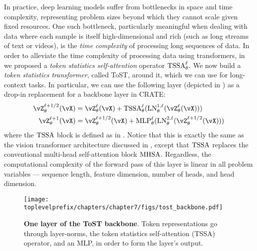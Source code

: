 \documentclass[../../book-main.tex]{subfiles}
\begin{document}
In practice, deep learning models suffer from bottlenecks in space and time complexity, representing problem sizes beyond which they cannot scale given fixed resources. One such bottleneck, particularly meaningful when dealing with data where each sample is itself high-dimensional and rich (such as long streams of text or videos), is the \textit{time complexity} of processing long sequences of data. In order to alleviate the time complexity of processing data using transformers, in  we proposed a \textit{token statistics self-attention} operator \(\operatorname{TSSA}_{\theta}^{\ell}\). We now build a \textit{token statistics transformer}, called ToST, around it, which we can use for long-context tasks. In particular, we can use the following layer (depicted in ) as a drop-in replacement for a backbone layer in CRATE:
\begin{align}
    \vZ_{\theta}^{\ell + 1/2}(\vX)
    &= \vZ_{\theta}^{\ell}(\vX) + \TSSA_{\theta}^{\ell}(\LN_{\theta}^{1, \ell}(\vZ_{\theta}^{\ell}(\vX))) \\ 
    \vZ_{\theta}^{\ell + 1}(\vX)
    &= \vZ_{\theta}^{\ell + 1/2}(\vX) + \MLP_{\theta}^{\ell}(\LN_{\theta}^{2, \ell}(\vZ_{\theta}^{\ell + 1/2}(\vX)))
\end{align}
where the \(\operatorname{TSSA}\) block is defined as in . Notice that this is exactly the same as the vision transformer architecture discussed in , except that \(\operatorname{TSSA}\) replaces the conventional multi-head self-attention block \(\operatorname{MHSA}\). Regardless, the computational complexity of the forward pass of this layer is linear in all problem variables --- sequence length, feature dimension, number of heads, and head dimension.

\begin{figure}[!htbp]
    \centering 
    \texttt{[image: \\toplevelprefix/chapters/chapter7/figs/tost\_backbone.pdf]}
    \caption{\small\textbf{One layer of the ToST backbone}. Token representations go through layer-norms, the token statistics self-attention (TSSA) operator, and an MLP, in order to form the layer's output.}
    \label{fig:tost_backbone}
\end{figure}
\end{document}
